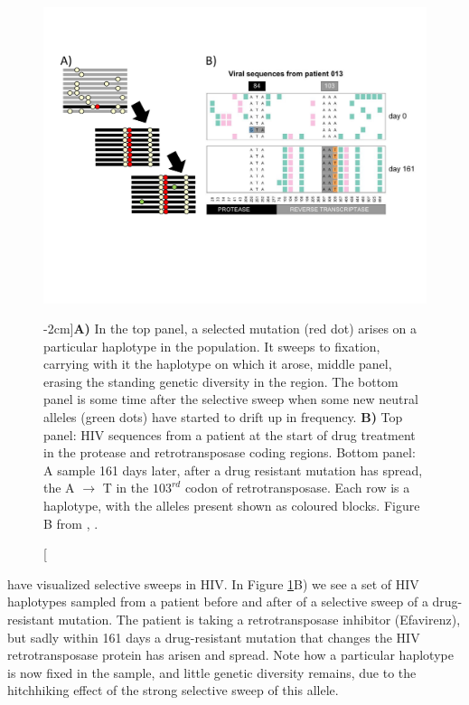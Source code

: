 \begin{figure}
\begin{center}
\includegraphics[width= \textwidth]{Journal_figs/recom_selection/Pleuni_HIV_sweep/HIV_no_recom_sweep.pdf}
\end{center}
\caption[][-2cm]{{\bf A)} In the top panel, a selected mutation (red dot) arises
on a particular haplotype in the population. It sweeps to fixation,
carrying with it the haplotype on which it arose, middle panel,
erasing the standing genetic diversity in the region. The bottom panel
is some time after the selective sweep when some new neutral alleles (green
dots) have started to drift up in frequency. {\bf B)}  Top panel: HIV
sequences from a patient at the start of drug treatment in the
protease and retrotransposase coding regions. Bottom panel: A sample
161 days later, after a drug resistant mutation has spread, the A
$\rightarrow$ T in the $103^{rd}$ codon of retrotransposase. Each row is a haplotype,
with the alleles present shown as coloured blocks. Figure B from
\citet{Williams548198}, \PLOSccBY.} \label{fig:HIV_sweep}  %
\end{figure}

\citet{Williams548198} have visualized selective sweeps in
HIV. In Figure \ref{fig:HIV_sweep}B) we see a set of HIV haplotypes
sampled from a patient before and after of a selective sweep of a
drug-resistant mutation. The patient is taking a
retrotransposase inhibitor (Efavirenz), but sadly within 161 days a
drug-resistant mutation that changes the HIV retrotransposase protein has arisen and spread. Note how a particular haplotype is now fixed in
the sample, and little genetic diversity remains, due to the
hitchhiking effect of the strong
selective sweep of this allele. 


